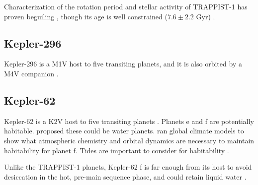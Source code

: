 Characterization of the rotation period and stellar activity of TRAPPIST-1 has proven beguiling \citep{Roettenbacher2017, Morris2018c, Rackham2018, Zhang2018}, though its age is well constrained ($7.6 \pm 2.2$ Gyr) \citep{Burgasser2017}. 


\subsection{Kepler-296}

Kepler-296 is a M1V host to five transiting planets, and it is also orbited by a M4V companion \citep{Lissauer2014, Torres2015, Barclay2015}. 

\subsection{Kepler-62}

Kepler-62 is a K2V host to five transiting planets \citep{Borucki2013}. Planets e and f are potentially habitable. \citet{Kaltenegger2013} proposed these could be water planets. \citet{Shields2016} ran global climate models to show what atmospheric chemistry and orbital dynamics are necessary to maintain habitability for planet f. Tides are important to consider for habitability \citep{Bolmont2014, Bolmont2015}.

Unlike the TRAPPIST-1 planets, Kepler-62 f is far enough from its host to avoid desiccation in the hot, pre-main sequence phase, and could retain liquid water \citep{Luger2015}. 



